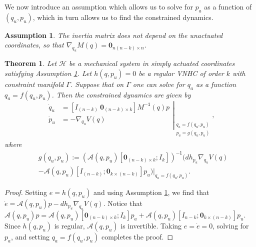 \documentclass[journal,twoside,web]{ieeecolor}
\newtheorem{thm}{Theorem}%
\newtheorem{assm}{Assumption} %
\newcommand*{\inv}{^\mathsf{-1}}
\newcommand*{\Minv}{M^\mathsf{-1}}
\newcommand*{\Id}[1]{I_{#1}}
\newcommand*{\Zmat}[1]{\bm{0}_{#1}}
\begin{document}
We now introduce an assumption which allows us to solve for \(p_a\) as a
function of \((q_u,p_u)\), which in turn allows us to find the constrained
dynamics.

\begin{assm}\label{assm:inertially-actuated}
The inertia matrix does not depend on the unactuated coordinates, so that 
\(\nabla_{q_u}M(q) = \Zmat{n(n-k) \times n}\).
\end{assm}

\begin{thm}\label{thm:zero-dynamics}
    Let \(\mathcal{H}\) be a mechanical system in simply actuated
    coordinates satisfying Assumption \ref{assm:inertially-actuated}. 
    Let \(h(q,p_u) = 0\) be a regular VNHC of order \(k\) with constraint
    manifold \(\Gamma\). Suppose that on \(\Gamma\) one can solve for
    \(q_a\) as a function \(q_a = f(q_u,p_u)\).
    Then the constrained dynamics are given by
    \begin{equation}\label{eqn:qpu-dynamics}
        \left.\begin{aligned}
                \dot{q}_u &= 
                \left[\Id{(n-k)} ~ \Zmat{(n-k) \times k}\right]
                \Minv(q)p \\
            \dot{p}_u &= -\nabla_{q_u}V(q) \\
            \end{aligned}{}\right|_{\begin{array}{c}
                q_a = f(q_u,p_u) \\ 
                p_a = g(q_u,p_u) \\
            \end{array}}
            ,
    \end{equation}
    where
    \begin{align}\label{eqn:g-qpu}
        &g(q_u,p_u) := 
        \left(\mathcal{A}(q,p_u)[\Zmat{(n-k)\times k};\Id{k}] \right)\inv 
        (dh_{p_u} \nabla_{q_u}V(q) \nonumber
        \\
        &- \mathcal{A}(q,p_u)[\Id{(n-k)};\Zmat{k \times(n-k)}]p_u
        \left.)\right|_{q_a = f(q_u,p_u)}
        .
    \end{align}
\end{thm}
\begin{proof}
    Setting \(e = h(q,p_u)\) and using Assumption
    \ref{assm:inertially-actuated}, we find that
    \(\dot{e} = \mathcal{A}(q,p_u)p - dh_{p_u}\nabla_{q_u}V(q)\).
    Notice that
    \(\mathcal{A}(q,p_u)p = \mathcal{A}(q,p_u)[\Zmat{(n-k)\times k}; \Id{k}]p_a
    + \mathcal{A}(q,p_u)[\Id{n-k};\Zmat{k \times (n-k)}] p_u\).
    Since \(h(q,p_u)\) is regular, \(\mathcal{A}(q,p_u)\) is invertible.
    Taking \(e = \dot{e} = 0\), solving for \(p_a\), and setting 
    \(q_a = f(q_u,p_u)\) completes the proof.
\end{proof}
\end{document}
